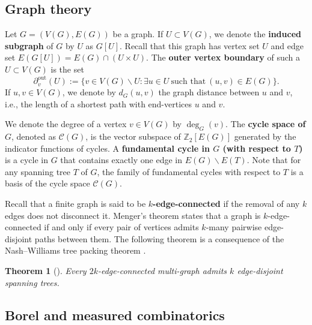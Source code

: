 \documentclass[letterpaper,11pt,reqno]{amsart}
\theoremstyle{bfnote}
\newtheorem{theorem}{Theorem}[section]
\theoremstyle{definition}
\newcommand{\0}{\varnothing}
\numberwithin{equation}{section}
\begin{document}
\subsection{Graph theory}


Let $G = (V(G),E(G))$ be a graph. If $U \subset V(G)$, we denote the \textbf{induced subgraph} of $G$ by $U$ as $G[U]$. Recall that this graph has vertex set $U$ and edge set $E(G[U]) = E(G) \cap (U\times U)$. The \textbf{outer vertex boundary} of such a $U\subset V(G)$ is the set $$
\partial_v^{\mathrm{out}} (U) := \{v \in V(G) \backslash U : \exists u \in U \ \text{such that}\ (u,v) \in E(G)\}.
$$
If $u,v\in V(G)$, we denote by $d_G (u,v)$ the graph distance between $u$ and $v$, i.e., the length of a shortest path with end-vertices $u$ and $v$.

We denote the degree of a vertex $v \in V(G)$ by $\deg_G (v)$. The \textbf{cycle space of $G$}, denoted as $\mathcal C (G)$, is the vector subspace of $\mathbb  Z_2 [E(G)]$ generated by the indicator functions of cycles. A \textbf{fundamental cycle in $G$ (with respect to $T$)} is a cycle in $G$ that contains exactly one edge in $ E(G) \backslash E(T)$. Note that for any spanning tree $T$ of $G$, the family of fundamental cycles with respect to $T$ is a basis of the cycle space $\mathcal C (G)$.

Recall that a finite graph is said to be \textbf{$k$-edge-connected} if the removal of any $k$ edges does not disconnect it. Menger's theorem \cite{Menger1927} states that a graph is $k$-edge-connected if and only if every pair of vertices admits $k$-many pairwise edge-disjoint paths between them.
The following theorem is a consequence of the Nash–Williams tree packing theorem \cite{nash1961edge,Tutte}.

\begin{theorem}[{\cite[Corollary 2.4.2]{diestel}}]\label{nash-williams}
    Every $2k$-edge-connected multi-graph admits $k$ edge-disjoint spanning trees.
\end{theorem}



\subsection{Borel and measured combinatorics}\label{sec:prelim_measured}
\end{document}
